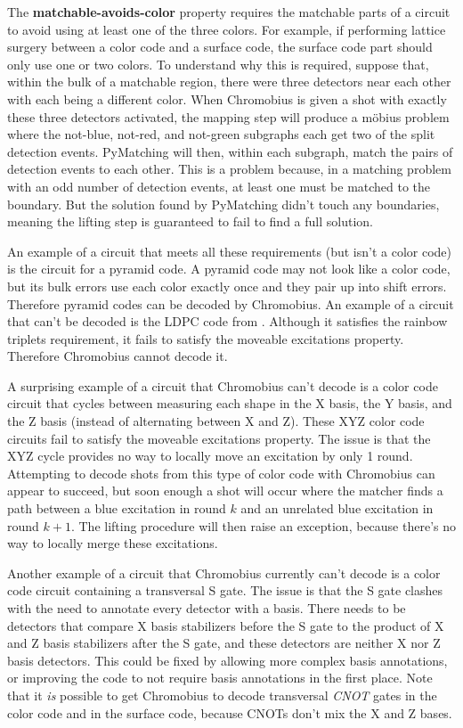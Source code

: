 \documentclass[onecolumn,unpublished,a4paper]{quantumarticle}
\theoremstyle{definition}
\theoremstyle{definition}
\theoremstyle{definition}
\begin{document}
The \textbf{matchable-avoids-color} property requires the matchable parts of a circuit to avoid using at least one of the three colors.
For example, if performing lattice surgery between a color code and a surface code, the surface code part should only use one or two colors.
To understand why this is required, suppose that, within the bulk of a matchable region, there were three detectors near each other with each being a different color.
When Chromobius is given a shot with exactly these three detectors activated, the mapping step will produce a m{\"o}bius problem where the not-blue, not-red, and not-green subgraphs each get two of the split detection events.
PyMatching will then, within each subgraph, match the pairs of detection events to each other.
This is a problem because, in a matching problem with an odd number of detection events, at least one must be matched to the boundary.
But the solution found by PyMatching didn't touch any boundaries, meaning the lifting step is guaranteed to fail to find a full solution.

An example of a circuit that meets all these requirements (but isn't a color code) is the circuit for a pyramid code.
A pyramid code may not look like a color code, but its bulk errors use each color exactly once and they pair up into shift errors.
Therefore pyramid codes can be decoded by Chromobius.
An example of a circuit that can't be decoded is the LDPC code from \cite{bravyi2023ldpcbiplanar}.
Although it satisfies the rainbow triplets requirement, it fails to satisfy the moveable excitations property.
Therefore Chromobius cannot decode it.

A surprising example of a circuit that Chromobius can't decode is a color code circuit that cycles between measuring each shape in the X basis, the Y basis, and the Z basis (instead of alternating between X and Z).
These XYZ color code circuits fail to satisfy the moveable excitations property.
The issue is that the XYZ cycle provides no way to locally move an excitation by only 1 round.
Attempting to decode shots from this type of color code with Chromobius can appear to succeed, but soon enough a shot will occur where the matcher finds a path between a blue excitation in round $k$ and an unrelated blue excitation in round $k+1$.
The lifting procedure will then raise an exception, because there's no way to locally merge these excitations.

Another example of a circuit that Chromobius currently can't decode is a color code circuit containing a transversal S gate.
The issue is that the S gate clashes with the need to annotate every detector with a basis.
There needs to be detectors that compare X basis stabilizers before the S gate to the product of X and Z basis stabilizers after the S gate, and these detectors are neither X nor Z basis detectors.
This could be fixed by allowing more complex basis annotations, or improving the code to not require basis annotations in the first place.
Note that it \emph{is} possible to get Chromobius to decode transversal \emph{CNOT} gates in the color code and in the surface code, because CNOTs don't mix the X and Z bases.
\end{document}
